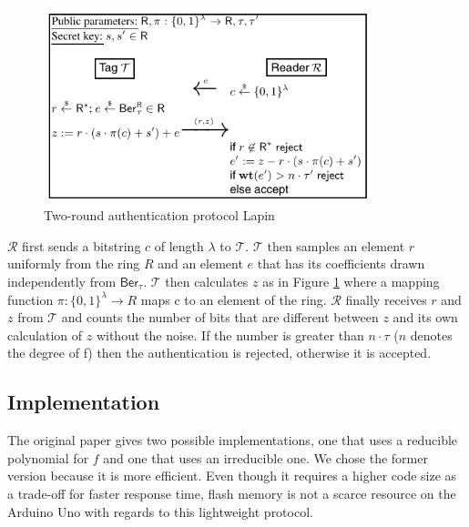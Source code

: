 \documentclass[11pt,a4paper]{article}
\begin{document}
\begin{figure}[h]
	\includegraphics[width=9.5cm]{lapin}
	\centering
	\caption{Two-round authentication protocol Lapin}
	\label{fig4}
\end{figure}

$\mathcal{R}$ first sends a bitstring $c$ of length $\lambda$ to $\mathcal{T}$. $\mathcal{T}$ then samples an element $r$ uniformly from the ring $R$ and an element $e$ that has its coefficients drawn independently from $\mathsf{Ber}_\tau$. 
$\mathcal{T}$ then calculates $z$ as in Figure \ref{fig4} where a mapping function $\pi: \{0,1\}^\lambda \rightarrow R$ maps c to an element of the ring. 
$\mathcal{R}$ finally receives $r$ and $z$ from $\mathcal{T}$ and counts the number of bits that are different between $z$ and its own calculation of $z$ without the noise. 
If the number is greater than $n \cdot \tau$ ($n$ denotes the degree of f) then the authentication is rejected, otherwise it is accepted.


\subsection{Implementation}

The original paper \cite{lapin} gives two possible implementations, one that uses a reducible polynomial for $f$ and one that uses an irreducible one.
We chose the former version because it is more efficient. Even though it requires a higher code size as a trade-off for faster response time, flash memory is not a scarce resource on the Arduino Uno with regards to this lightweight protocol. 
\end{document}
